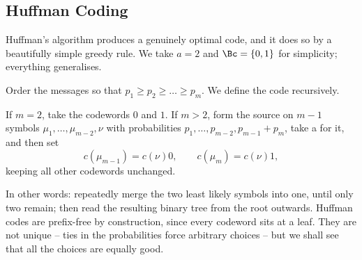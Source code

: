 \subsection{Huffman Coding}

Huffman's algorithm produces a genuinely optimal code, and it does so by a beautifully simple greedy rule. We take $a = 2$ and $\Bc = \{0,1\}$ for simplicity; everything generalises.

Order the messages so that $p_1 \ge p_2 \ge \dots \ge p_m$. We define the code recursively.

\begin{definition}
	If $m = 2$, take the codewords $0$ and $1$. If $m > 2$, form the source on $m-1$ symbols $\mu_1, \dots, \mu_{m-2}, \nu$ with probabilities $p_1, \dots, p_{m-2}, p_{m-1}+p_m$, take a  for it, and then set
	$$c(\mu_{m-1}) = c(\nu)0, \qquad c(\mu_m) = c(\nu)1,$$
	keeping all other codewords unchanged.
\end{definition}

In other words: repeatedly merge the two least likely symbols into one, until only two remain; then read the resulting binary tree from the root outwards. Huffman codes are prefix-free by construction, since every codeword sits at a leaf. They are not unique -- ties in the probabilities force arbitrary choices -- but we shall see that all the choices are equally good.

